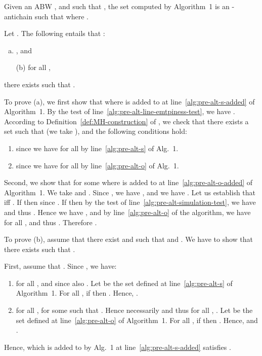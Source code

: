\documentclass{LMCS}
\begin{document}
\begin{thm}\label{theo:correctness-alg-pre-alt}
  Given an ABW , 
   and  such that , 
  the set 
  computed by Algorithm~1 is an -antichain such that
   where 
  .
\end{thm}

\proof 
Let .
The following entails that :
\begin{enumerate}[(a)]
\item , and 
\item[(b)] for all , 
\end{enumerate}
there exists  such that .

To prove (a), we first show that 
where  is added to  at line~\ref{alg:pre-alt-s-added} of 
Algorithm~1.
By the test of line~\ref{alg:pre-alt-line-emtpiness-test}, we have . 
According to Definition~\ref{def:MH-construction} of , we check that 
there exists a set  such that 
(we take ), and the following conditions hold:
\begin{enumerate}[]
\item  since 
we have  for all  
by line~\ref{alg:pre-alt-s} of Alg.~1.\item  since
we have  for all 
by line~\ref{alg:pre-alt-o} of Alg.~1.\end{enumerate}

Second, we show that  for 
some  where 
is added to  at line~\ref{alg:pre-alt-o-added} of Algorithm~1.
We take  and . 
Since , we  have  ,
and we have  . 
Let us establish that   iff .
If  then  since .
If  then by the test of line~\ref{alg:pre-alt-simulation-test},
we have  and thus .
Hence we have ,
and by line~\ref{alg:pre-alt-o} of the algorithm, we have 
 for all , and thus 
. Therefore
.

To prove (b), assume that there exist  and 
such that  and 
.
We have to show that there exists  such that 
.

First, assume that .
Since ,
we have:
\begin{enumerate}[]  
\item for all ,  and since 
 also . Let 
be the set defined at line~\ref{alg:pre-alt-s} of Algorithm~1.
For all , if  then .
Hence, .

\item for all , 
for some  such that . 
Hence necessarily 
and thus for all , .
Let  be the set defined at line~\ref{alg:pre-alt-o} of Algorithm~1.
For all , if  
then . Hence,  and .
\end{enumerate}
\noindent
Hence,  which is added to  by Alg.~1 at 
line~\ref{alg:pre-alt-s-added} satisfies .
\end{document}
